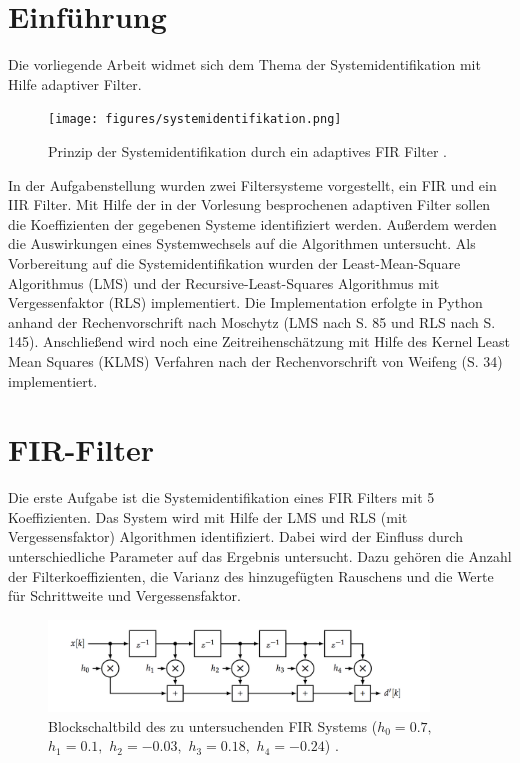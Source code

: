 \section{Einführung}
\label{sec:intor}

Die vorliegende Arbeit widmet sich dem Thema der Systemidentifikation mit Hilfe adaptiver Filter.

\begin{figure}[H]
  \centering
  \texttt{[image: figures/systemidentifikation.png]}
  \caption{Prinzip der Systemidentifikation durch ein adaptives FIR Filter \cite{moschytz2000book}.}
  \label{fig:Systemidentifikation}
\end{figure}

In der Aufgabenstellung \cite{aufgabenstellung} wurden zwei Filtersysteme vorgestellt, ein FIR und ein IIR Filter.
Mit Hilfe der in der Vorlesung besprochenen adaptiven Filter sollen die Koeffizienten der gegebenen Systeme identifiziert werden.
Außerdem werden die Auswirkungen eines Systemwechsels auf die Algorithmen untersucht.
Als Vorbereitung auf die Systemidentifikation wurden der Least-Mean-Square Algorithmus (LMS) und der Recursive-Least-Squares Algorithmus mit Vergessenfaktor (RLS) implementiert.
Die Implementation erfolgte in Python anhand der Rechenvorschrift nach Moschytz \cite{moschytz2000book} (LMS nach S. 85 und RLS nach S. 145).
Anschließend wird noch eine Zeitreihenschätzung mit Hilfe des Kernel Least Mean Squares (KLMS) Verfahren nach der Rechenvorschrift von Weifeng \cite{weifeng2010} (S. 34) implementiert.

\section{FIR-Filter}
\label{sec:fir}

Die erste Aufgabe ist die Systemidentifikation eines FIR Filters mit 5 Koeffizienten.
Das System wird mit Hilfe der LMS und RLS (mit Vergessensfaktor) Algorithmen identifiziert.
Dabei wird der Einfluss durch unterschiedliche Parameter auf das Ergebnis untersucht.
Dazu gehören die Anzahl der Filterkoeffizienten, die Varianz des hinzugefügten Rauschens und die Werte für Schrittweite und Vergessensfaktor.

\begin{figure}[H]
  \centering
      \includegraphics[width=0.9\textwidth]{figures/FIR_System.png}
 \caption{Blockschaltbild des zu untersuchenden FIR Systems (${h_0 = 0.7,}$ ${h_1 = 0.1,}$ ${h_2 = -0.03,}$ ${h_3 = 0.18,}$ ${h_4 = -0.24}$) \cite{aufgabenstellung}.}
	\label{fig:FIR_System}
\end{figure}

